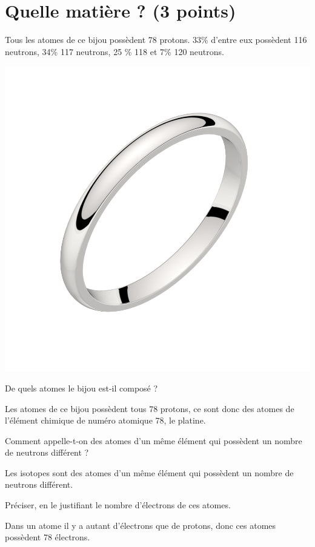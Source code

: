 \section{Quelle matière ? (3 points)}\label{ex:bague}

\begin{multicols}{2}
	Tous les atomes de ce bijou possèdent 78 protons. 33\% d'entre eux possèdent 116 neutrons, 34\% 117 neutrons, 25 \% 118 et 7\% 120 neutrons.

	
	\begin{center}
		\includegraphics[scale=0.12]{img/ring2}
	\end{center}
\end{multicols}


\begin{questions}
	\question[1] De quels atomes le bijou est-il composé ?
	\begin{solution}
		Les atomes de ce bijou possèdent tous 78 protons, ce sont donc des atomes de l'élément chimique de numéro atomique 78, le platine.
	\end{solution}
	
	\question[1] Comment appelle-t-on des atomes d'un même élément qui possèdent un nombre de neutrons différent ?
	\begin{solution}
		Les isotopes sont des atomes d'un même élément qui possèdent un nombre de neutrons différent.
	\end{solution}
	
	\question[1] Préciser, en le justifiant le nombre d'électrons de ces atomes.
	\begin{solution}
		Dans un atome il y a autant d'électrons que de protons, donc ces atomes possèdent 78 électrons. 
	\end{solution}
\end{questions}
